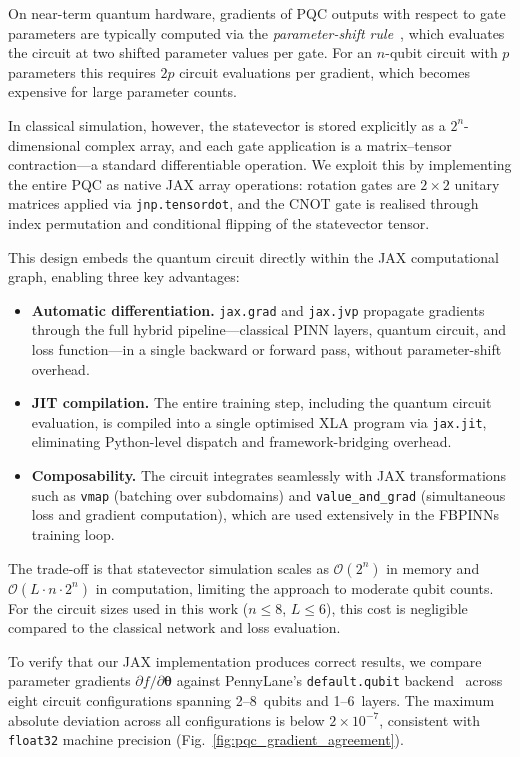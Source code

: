 On near-term quantum hardware, gradients of PQC outputs with respect to
gate parameters are typically computed via the \emph{parameter-shift
rule}~\cite{mitarai2018quantum, schuld2019evaluating}, which evaluates
the circuit at two shifted parameter values per gate.  For an $n$-qubit
circuit with $p$ parameters this requires $2p$ circuit evaluations per
gradient, which becomes expensive for large parameter counts.

In classical simulation, however, the statevector is stored explicitly
as a $2^n$-dimensional complex array, and each gate application is a
matrix--tensor contraction---a standard differentiable operation.  We
exploit this by implementing the entire PQC as native JAX array
operations: rotation gates are $2\!\times\!2$ unitary matrices applied
via \texttt{jnp.tensordot}, and the CNOT gate is realised through index
permutation and conditional flipping of the statevector tensor.

This design embeds the quantum circuit directly within the JAX
computational graph, enabling three key advantages:
\begin{itemize}
  \item \textbf{Automatic differentiation.}  \texttt{jax.grad} and
    \texttt{jax.jvp} propagate gradients through the full hybrid
    pipeline---classical PINN layers, quantum circuit, and loss
    function---in a single backward or forward pass, without
    parameter-shift overhead.
  \item \textbf{JIT compilation.}  The entire training step, including
    the quantum circuit evaluation, is compiled into a single optimised
    XLA program via \texttt{jax.jit}, eliminating Python-level dispatch
    and framework-bridging overhead.
  \item \textbf{Composability.}  The circuit integrates seamlessly with
    JAX transformations such as \texttt{vmap} (batching over subdomains)
    and \texttt{value\_and\_grad} (simultaneous loss and gradient
    computation), which are used extensively in the FBPINNs training
    loop.
\end{itemize}

The trade-off is that statevector simulation scales as
$\mathcal{O}(2^n)$ in memory and $\mathcal{O}(L \cdot n \cdot 2^n)$ in
computation, limiting the approach to moderate qubit counts.  For the
circuit sizes used in this work ($n \leq 8$, $L \leq 6$), this cost is
negligible compared to the classical network and loss evaluation.

To verify that our JAX implementation produces correct results, we
compare parameter gradients $\partial f / \partial\boldsymbol{\theta}$
against PennyLane's \texttt{default.qubit}
backend~\cite{bergholm2018pennylane} across eight circuit configurations
spanning 2--8~qubits and 1--6~layers.  The maximum absolute deviation
across all configurations is below $2 \times 10^{-7}$, consistent with
\texttt{float32} machine precision
(Fig.~\ref{fig:pqc_gradient_agreement}).


